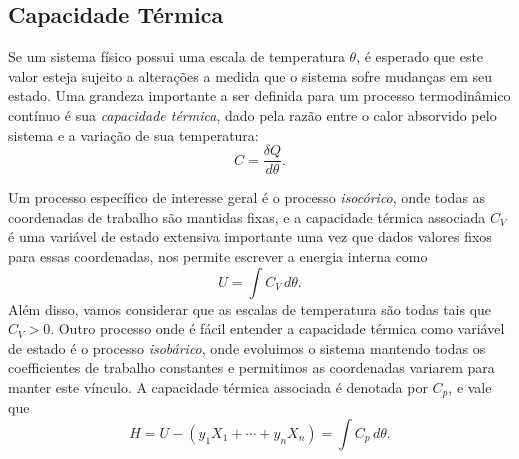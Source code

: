 \documentclass[a4paper, 12pt]{article}
\theoremstyle{definition}
\theoremstyle{definition}
\begin{document}
\subsection{Capacidade Térmica}

Se um sistema físico possui uma escala de temperatura $\theta$, é esperado que este valor esteja sujeito a
alterações a medida que o sistema sofre mudanças em seu estado. Uma grandeza importante a ser definida para
um processo termodinâmico contínuo é sua \textit{capacidade térmica}, dado pela razão entre o calor absorvido
pelo sistema e a variação de sua temperatura:
$$C=\frac{\delta Q}{d\theta}.$$

Um processo específico de interesse geral é o processo \textit{isocórico}, onde todas as coordenadas de trabalho
são mantidas fixas, e a capacidade térmica associada $C_V$ é uma variável de estado extensiva importante uma 
vez que dados valores fixos para essas coordenadas, nos permite escrever a energia interna como
$$U=\int C_V\,d\theta.$$
Além disso, vamos considerar que as escalas de temperatura são todas tais que $C_V>0$. Outro processo onde
é fácil entender a capacidade térmica como variável de estado é o processo \textit{isobárico}, onde evoluimos
o sistema mantendo todas os coefficientes de trabalho constantes e permitimos as coordenadas variarem para
manter este vínculo. A capacidade térmica associada é denotada por $C_p$, e vale que
$$H=U-(y_1X_1+\cdots+y_nX_n)=\int C_p\,d\theta.$$
\end{document}

